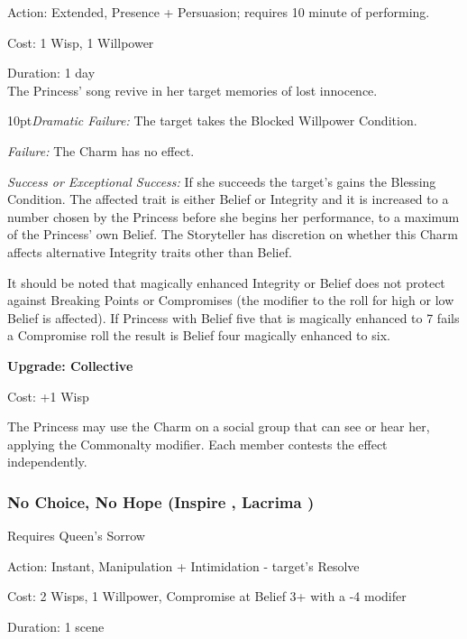 \noindent Action: Extended, Presence + Persuasion; requires 10 minute of performing. 

\noindent Cost: 1 Wisp, 1 Willpower

\noindent Duration: 1 day \\

\noindent The Princess’ song revive in her target memories of lost innocence. 

\begin{myindentpar}{10pt}\emph{Dramatic Failure:} The target takes the Blocked Willpower Condition.

    \emph{Failure:} The Charm has no effect.

    \emph{Success or Exceptional Success:} If she succeeds the target's gains the Blessing Condition. The affected trait is either Belief or Integrity and it is increased to a number chosen by the Princess before she begins her performance, to a maximum of the Princess' own Belief. The Storyteller has discretion on whether this Charm affects alternative Integrity traits other than Belief.  

It should be noted that magically enhanced Integrity or Belief does not protect against Breaking Points or Compromises (the modifier to the roll for high or low Belief is affected). If Princess with Belief five that is magically enhanced to 7 fails a Compromise roll the result is Belief four magically enhanced to six. 

\textbf{Upgrade: Collective}

\noindent Cost: +1 Wisp

The Princess may use the Charm on a social group that can see or hear her, applying the Commonalty modifier. Each member contests the effect independently.\end{myindentpar}

\subsubsection*{No Choice, No Hope (Inspire \textbullet\textbullet\textbullet\textbullet, Lacrima \textbullet\textbullet\textbullet)}

\noindent Requires Queen's Sorrow

\noindent Action: Instant, Manipulation + Intimidation - target's Resolve

\noindent Cost: 2 Wisps, 1 Willpower, Compromise at Belief 3+ with a -4 modifer

\noindent Duration: 1 scene \\

